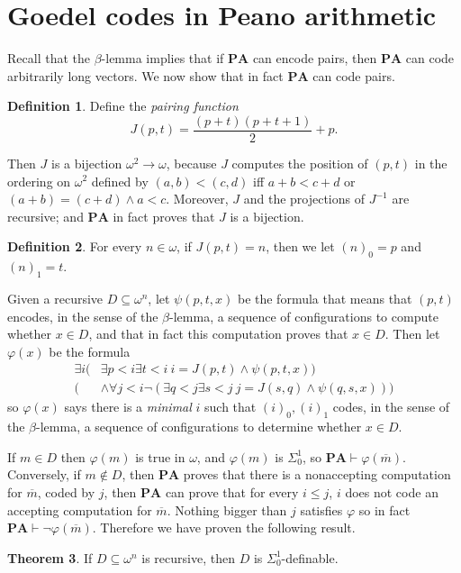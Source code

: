 \documentclass[12pt]{report}
\newcommand{\PA}{\mathbf{PA}}
\newcommand{\proves}{\vdash}
\newcommand{\dfn}[1]{\emph{#1}\index{#1}}
\theoremstyle{definition}
\newtheorem{theorem}{Theorem}[chapter]
\newtheorem{definition}[theorem]{Definition}
\begin{document}
\section{Goedel codes in Peano arithmetic}
Recall that the $\beta$-lemma implies that if $\PA$ can encode pairs, then $\PA$ can code arbitrarily long vectors.
We now show that in fact $\PA$ can code pairs.
\begin{definition}
Define the \dfn{pairing function}
$$J(p, t) = \frac{(p+t)(p+t+1)}{2} + p.$$
\end{definition}
Then $J$ is a bijection $\omega^2 \to \omega$, because $J$ computes the position of $(p, t)$ in the ordering on $\omega^2$ defined by $(a, b) < (c, d)$ iff $a + b < c + d$ or $(a + b) = (c + d) \wedge a < c$.
Moreover, $J$ and the projections of $J^{-1}$ are recursive; and $\PA$ in fact proves that $J$ is a bijection.
\begin{definition}
For every $n \in \omega$, if $J(p, t) = n$, then we let $(n)_0 = p$ and $(n)_1 = t$.
\end{definition}

Given a recursive $D \subseteq \omega^n$, let $\psi(p, t, x)$ be the formula that means that $(p, t)$ encodes, in the sense of the $\beta$-lemma, a sequence of configurations to compute whether $x \in D$, and that in fact this computation proves that $x \in D$.
Then let $\varphi(x)$ be the formula
\begin{align*}\exists i (&\exists p < i \exists t < i~i = J(p,t) \wedge \psi(p, t, x)) \\
(&\wedge \forall j < i \neg(\exists q < j \exists s < j~j=J(s,q) \wedge \psi(q, s, x)))\end{align*}
so $\varphi(x)$ says there is a \emph{minimal} $i$ such that $(i)_0,(i)_1$ codes, in the sense of the $\beta$-lemma, a sequence of configurations to determine whether $x \in D$.

If $m \in D$ then $\varphi(m)$ is true in $\omega$, and $\varphi(m)$ is $\Sigma_0^1$, so $\PA \proves \varphi(\overline m)$.
Conversely, if $m \notin D$, then $\PA$ proves that there is a nonaccepting computation for $\overline m$, coded by $j$, then $\PA$ can prove that for every $i \leq j$, $i$ does not code an accepting computation for $\overline m$. Nothing bigger than $j$ satisfies $\varphi$ so in fact $\PA \proves \neg \varphi(\overline m)$.
Therefore we have proven the following result.
\begin{theorem}
If $D \subseteq \omega^n$ is recursive, then $D$ is $\Sigma_0^1$-definable.
\end{theorem}
\end{document}
